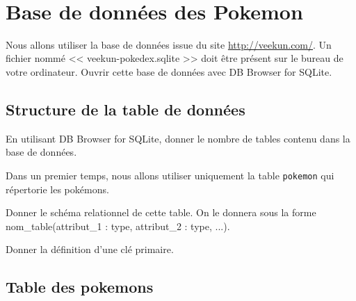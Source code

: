 \exer{[SQL-005]}
\setcounter{numques}{0}~\\


\section*{Base de données des Pokemon}
\label{sec:bdd}

Nous allons utiliser la base de données issue du site \url{http://veekun.com/}. Un fichier nommé << veekun-pokedex.sqlite >> doit être présent sur le bureau de votre ordinateur. Ouvrir cette base de données avec DB Browser for SQLite.


%

\subsection*{Structure de la table de données}

\question{}
En utilisant DB Browser for SQLite, donner le nombre de tables contenu dans la base de données. 


Dans un premier temps, nous allons utiliser uniquement la table \texttt{pokemon} qui répertorie les pokémons.

\question{}
Donner le schéma relationnel de cette table. On le donnera sous la forme nom\_table(attribut\_1 : type, attribut\_2 : type, ...).

\question{}
Donner la définition d'une clé primaire.

\subsection*{Table des pokemons}



